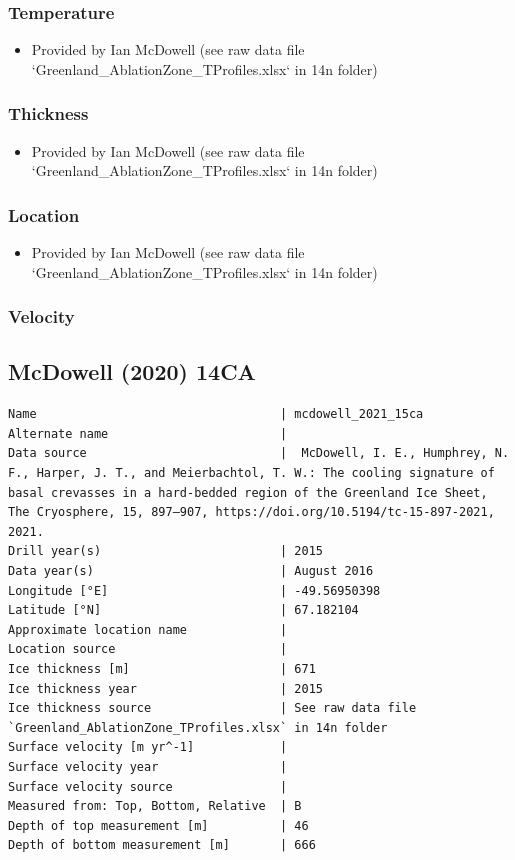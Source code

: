 \documentclass[article,a4paper,times,11pt,twoside]{article}
\begin{document}
\subsubsection{Temperature}
\label{sec:orgc1b2052}

\begin{itemize}
\item Provided by Ian McDowell (see raw data file `Greenland\_AblationZone\_TProfiles.xlsx` in 14n folder)
\end{itemize}

\subsubsection{Thickness}
\label{sec:org7ecd6d6}

\begin{itemize}
\item Provided by Ian McDowell (see raw data file `Greenland\_AblationZone\_TProfiles.xlsx` in 14n folder)
\end{itemize}

\subsubsection{Location}
\label{sec:orgfccbb9a}

\begin{itemize}
\item Provided by Ian McDowell (see raw data file `Greenland\_AblationZone\_TProfiles.xlsx` in 14n folder)
\end{itemize}

\subsubsection{Velocity}
\label{sec:orgb4088b4}
\clearpage
\subsection{McDowell (2020) 14CA}
\label{sec:orgb8ebcc7}
\begin{verbatim}
Name                                  | mcdowell_2021_15ca
Alternate name                        | 
Data source                           |  McDowell, I. E., Humphrey, N. F., Harper, J. T., and Meierbachtol, T. W.: The cooling signature of basal crevasses in a hard-bedded region of the Greenland Ice Sheet, The Cryosphere, 15, 897–907, https://doi.org/10.5194/tc-15-897-2021, 2021.
Drill year(s)                         | 2015
Data year(s)                          | August 2016
Longitude [°E]                        | -49.56950398
Latitude [°N]                         | 67.182104
Approximate location name             | 
Location source                       | 
Ice thickness [m]                     | 671
Ice thickness year                    | 2015
Ice thickness source                  | See raw data file `Greenland_AblationZone_TProfiles.xlsx` in 14n folder
Surface velocity [m yr^-1]            | 
Surface velocity year                 | 
Surface velocity source               | 
Measured from: Top, Bottom, Relative  | B
Depth of top measurement [m]          | 46
Depth of bottom measurement [m]       | 666
\end{verbatim}
\end{document}
